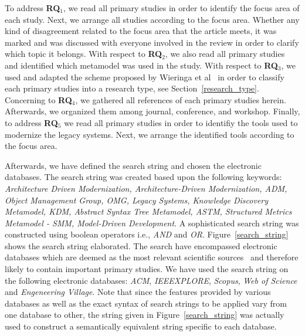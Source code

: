 To address \textbf{RQ$_1$}, we read all primary studies in order to identify the focus area of each study. Next, we arrange all studies according to the focus area. Whether any kind of disagreement related to the focus area that the article meets, it was marked and was discussed with everyone involved in the review in order to clarify which topic it belongs. With respect to \textbf{RQ$_2$}, we also read all primary studies and identified which metamodel was used in the study. With respect to \textbf{RQ$_3$}, we used and adapted the scheme proposed by Wieringa et al~\cite{Wieringa:2005:REP:1107677.1107683} in order to classify each primary studies into a research type, see Section~\ref{research_type}. Concerning to \textbf{RQ$_4$}, we gathered all references of each primary studies herein. Afterwards, we organized them among journal, conference, and workshop. Finally, to address \textbf{RQ$_5$} we read all primary studies in order to identifiy the tools used to modernize the legacy systems. Next, we arrange the identified tools according to the focus area. 


Afterwards, we have defined the search string and chosen the electronic databases. The search string was created based upon the following keywords: \textit{Architecture Driven Modernization, Architecture-Driven Modernization, ADM, Object Management Group, OMG, Legacy Systems, Knowledge Discovery Metamodel, KDM, Abstract Syntax Tree Metamodel, ASTM, Structured Metrics Metamodel - SMM, Model-Driven Development}. A sophisticated search string was constructed using boolean operators i.e., \textit{AND} and \textit{OR}. Figure~\ref{search_string} shows the search string elaborated. The search have encompassed electronic databases which are deemed as the most relevant scientific sources~\cite{Dyba} and therefore likely to contain important primary studies. We have used the search string on the following electronic databases: \textit{ACM}, \textit{IEEEXPLORE}, \textit{Scopus}, \textit{Web of Science} and \textit{Engeneering Village}. Note that since the features provided by various databases as well as the exact syntax of search strings to be applied vary from one database to other, the string given in Figure~\ref{search_string} was actually used to construct a semantically equivalent string specific to each database.


